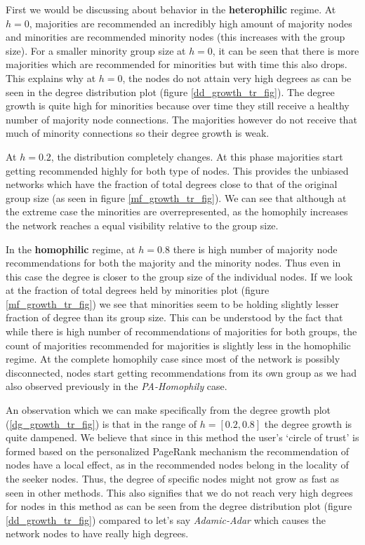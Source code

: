 First we would be discussing about behavior in the \textbf{heterophilic} regime. At $h=0$, majorities are recommended an incredibly high amount of majority nodes and minorities are recommended minority nodes (this increases with the group size). For a smaller minority group size at $h=0$, it can be seen that there is more majorities which are recommended for minorities but with time this also drops. This explains why at $h=0$, the nodes do not attain very high degrees as can be seen in the degree distribution plot (figure \ref{dd_growth_tr_fig}). The degree growth is quite high for minorities because over time they still receive a healthy number of majority node connections. The majorities however do not receive that much of minority connections so their degree growth is weak. 

At $h=0.2$, the distribution completely changes. At this phase majorities start getting recommended highly for both type of nodes. This provides the unbiased networks which have the fraction of total degrees close to that of the original group size (as seen in figure \ref{mf_growth_tr_fig}). We can see that although at the extreme case the minorities are overrepresented, as the homophily increases the network reaches a equal visibility relative to the group size. 

In the \textbf{homophilic} regime, at $h=0.8$ there is high number of majority node recommendations for both the majority and the minority nodes. Thus even in this case the degree is closer to the group size of the individual nodes. If we look at the fraction of total degrees held by minorities plot (figure \ref{mf_growth_tr_fig}) we see that minorities seem to be holding slightly lesser fraction of degree than its group size. This can be understood by the fact that while there is high number of recommendations of majorities for both groups, the count of majorities recommended for majorities is slightly less in the homophilic regime. At the complete homophily case since most of the network is possibly disconnected, nodes start getting recommendations from its own group as we had also observed previously in the \textit{PA-Homophily} case. 

An observation which we can make specifically from the degree growth plot (\ref{dg_growth_tr_fig}) is that in the range of $h=[0.2, 0.8]$ the degree growth is quite dampened. We believe that since in this method the user's `circle of trust' is formed based on the personalized PageRank mechanism the recommendation of nodes have a local effect, as in the recommended nodes belong in the locality of the seeker nodes. Thus, the degree of specific nodes might not grow as fast as seen in other methods. This also signifies that we do not reach very high degrees for nodes in this method as can be seen from the degree distribution plot (figure \ref{dd_growth_tr_fig}) compared to let's say \textit{Adamic-Adar} which causes the network nodes to have really high degrees. 

